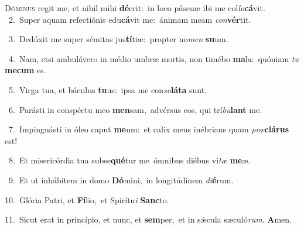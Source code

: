 \lettrine{\initial\textcolor{\initialcolor}{D}}{óminus} regit me, et nihil mihi \textbf{dé}\-erit:~\star in loco páscuæ ibi me col\-\textit{lo}\-\textbf{cá}vit.\\
{\numbfont\textcolor{\numbcolor}{~2.}}~Super aquam refectiónis edu\-\textbf{cá}\-vit me:~\star ánimam meam \textit{con}\-\textbf{vér}tit.\par
{\numbfont\textcolor{\numbcolor}{~3.}}~Dedúxit me super sémitas jus\-\textbf{tí}\-tiæ:~\star propter no\textit{men} \textbf{su}\-um.\par
{\numbfont\textcolor{\numbcolor}{~4.}}~Nam, etsi ambulávero in médio umbræ mortis, non timébo \textbf{ma}\-la:~\star quóniam \textit{tu} \textbf{me}\-\textbf{cum} es.\par
{\numbfont\textcolor{\numbcolor}{~5.}}~Virga tua, et báculus \textbf{tu}\-us:~\star ipsa me con\-\textit{so}\-\textbf{lá}\textbf{ta} sunt.\par
{\numbfont\textcolor{\numbcolor}{~6.}}~Parásti in conspéctu meo \textbf{men}\-sam,~\star advérsus eos, qui trí\-\textit{bu}\-\textbf{lant} me.\par
{\numbfont\textcolor{\numbcolor}{~7.}}~Impinguásti in óleo caput \textbf{me}\-um:~\star et calix meus inébrians quam \textit{præ}\-\textbf{clá}\textbf{rus} est!\par
{\numbfont\textcolor{\numbcolor}{~8.}}~Et misericórdia tua subse\-\textbf{qué}\-tur me~\star ómnibus diébus vi\textit{tæ} \textbf{me}\-æ.\par
{\numbfont\textcolor{\numbcolor}{~9.}}~Et ut inhábitem in domo \textbf{Dó}\-mini,~\star in longitúdinem \textit{di}\-\textbf{é}rum.\par
{\numbfont\textcolor{\numbcolor}{10.}}~Glória Patri, et \textbf{Fí}\-lio,~\star et Spirítu\textit{i} \textbf{Sanc}\-to.\par
{\numbfont\textcolor{\numbcolor}{11.}}~Sicut erat in princípio, et nunc, et \textbf{sem}\-per,~\star et in sǽcula sæculó\-\textit{rum}\-. \textbf{A}\-men.\par
